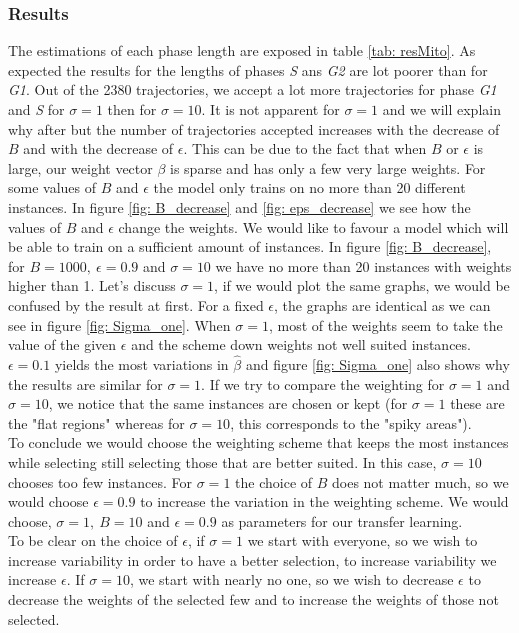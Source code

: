 \documentclass{article}
\begin{document}
\subsubsection{Results}

The estimations of each phase length are exposed in table \ref{tab: resMito}. As expected the results for the lengths of phases \textit{S} ans \textit{G2} are lot poorer than for \textit{G1}. Out of the 2380 trajectories, we accept a lot more trajectories for phase \textit{G1} and \textit{S} for $\sigma=1$ then for $\sigma=10$. It is not apparent for $\sigma=1$ and we will explain why after but the number of trajectories accepted increases with the decrease of $B$ and with the decrease of $\epsilon$. This can be due to the fact that when $B$ or $\epsilon$ is large, our weight vector $\beta$ is sparse and has only a few very large weights. For some values of $B$ and $\epsilon$ the model only trains on no more than 20 different instances. In figure \ref{fig: B_decrease} and \ref{fig: eps_decrease} we see how the values of $B$ and $\epsilon$ change the weights. We would like to favour a model which will be able to train on a sufficient amount of instances. In figure \ref{fig: B_decrease}, for $B=1000, \ \epsilon=0.9$ and $\sigma=10$ we have no more than 20 instances with weights higher than 1. Let’s discuss $\sigma=1$, if we would plot the same graphs, we would be confused by the result at first. For a fixed $\epsilon$, the graphs are identical as we can see in figure \ref{fig: Sigma_one}. When $\sigma=1$, most of the weights seem to take the value of the given $\epsilon$ and the scheme down weights not well suited instances. $\epsilon = 0.1 $ yields the most variations in $\hat{\beta}$ and figure \ref{fig: Sigma_one} also shows why the results are similar for $\sigma=1$. If we try to compare the weighting for $\sigma=1$ and $\sigma=10$, we notice that the same instances are chosen or kept (for $\sigma=1$ these are the "flat regions" whereas for $\sigma=10$, this corresponds to the "spiky areas"). \\
To conclude we would choose the weighting scheme that keeps the most instances while selecting still selecting those that are better suited. In this case, $\sigma=10$ chooses too few instances. For $\sigma=1$ the choice of $B$ does not matter much, so we would choose $\epsilon=0.9$ to increase the variation in the weighting scheme. We would choose, $\sigma=1, \ B=10$ and $\epsilon=0.9$ as parameters for our transfer learning.
\\ To be clear on the choice of $\epsilon$, if $\sigma=1$ we start with everyone, so we wish to increase variability in order to have a better selection, to increase variability we increase $\epsilon$. If $\sigma=10$, we start with nearly no one, so we wish to decrease $\epsilon$ to decrease the weights of the selected few and to increase the weights of those not selected.
\end{document}
